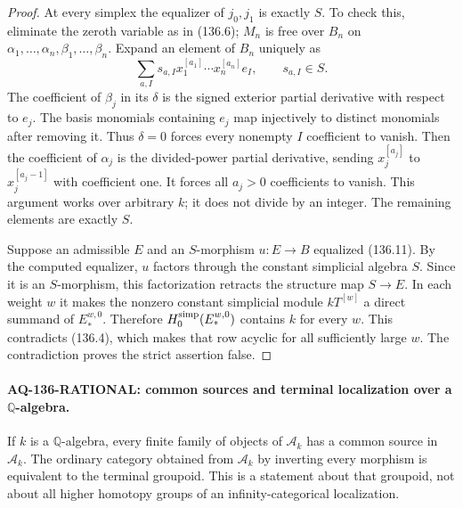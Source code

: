 \begin{proof}
At every simplex the equalizer of $j_0,j_1$ is exactly
$S$.  To check this, eliminate the zeroth variable as
in (136.6); $M_n$ is free over $B_n$ on
$\alpha_1,\ldots,\alpha_n,\beta_1,\ldots,\beta_n$.
Expand an element of $B_n$ uniquely as
\[
 \sum_{a,I}s_{a,I}x_1^{[a_1]}\cdots x_n^{[a_n]}e_I,
 \qquad s_{a,I}\in S.
\]
The coefficient of $\beta_j$ in its $\delta$ is the
signed exterior partial derivative with respect to $e_j$.
The basis monomials containing $e_j$ map injectively to
distinct monomials after removing it.  Thus $\delta=0$
forces every nonempty $I$ coefficient to vanish.
Then the coefficient of $\alpha_j$ is the divided-power
partial derivative, sending $x_j^{[a_j]}$ to
$x_j^{[a_j-1]}$ with coefficient one.  It forces all
$a_j>0$ coefficients to vanish.  This argument works
over arbitrary $k$; it does not divide by an integer.
The remaining elements are exactly $S$.

Suppose an admissible $E$ and an $S$-morphism $u:E\to B$
equalized (136.11).  By the computed equalizer, $u$
factors through the constant simplicial algebra $S$.
Since it is an $S$-morphism, this factorization retracts
the structure map $S\to E$.  In each weight $w$ it makes
the nonzero constant simplicial module
$kT^{[w]}$ a direct summand of $E_*^{w,0}$.
Therefore $H_0^{\rm simp}(E_*^{w,0})$ contains $k$ for
every $w$.  This contradicts (136.4), which makes that
row acyclic for all sufficiently large $w$.
The contradiction proves the strict assertion false.
\end{proof}

\paragraph{AQ-136-RATIONAL: common sources and terminal localization over a $\mathbb Q$-algebra.}
If $k$ is a $\mathbb Q$-algebra, every finite family of
objects of $\mathcal A_k$ has a common source in
$\mathcal A_k$.  The ordinary category obtained from
$\mathcal A_k$ by inverting every morphism is equivalent
to the terminal groupoid.  This is a statement about
that groupoid, not about all higher homotopy groups of
an infinity-categorical localization.

